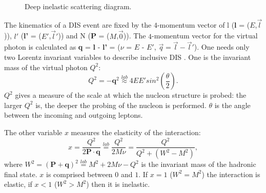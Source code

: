 \begin{figure}[!h]
  \centering

	\caption{Deep inelastic scattering diagram.}
	\label{pic:DIS}
\end{figure}

The kinematics of a DIS event are fixed by the $4$-momentum vector of l (\textbf{l} = ($E$,$\vec{l}$)), $l'$ (\textbf{l'} = ($E'$,$\vec{l}'$)) and N (\textbf{P} = ($M$,$\vec{0}$)). The $4$-momentum vector for the virtual photon is calculated as \textbf{q} = \textbf{l} - \textbf{l'} = ($\nu$ = $E$ - $E'$, $\vec{q}=\vec{l}-\vec{l}'$). One needs only two Lorentz invariant variables to describe inclusive DIS \cite{DISmeas}. One is the invariant mass of the virtual photon $Q^2$:
%
\begin{equation}
  Q^2 = -\textbf{q}^2 \stackrel{lab}{\approx} 4EE'sin^2\left(\frac{\theta}{2}\right).
\end{equation}
%
$Q^2$ gives a measure of the scale at which the nucleon structure is probed: the larger $Q^2$ is, the deeper the probing of the nucleon is performed. $\theta$ is the angle between the incoming and outgoing leptons.

The other variable $x$ measures the elasticity of the interaction:
%
\begin{equation}
  x = \frac{Q^2}{2\textbf{P}\cdot\textbf{q}} \stackrel{lab}{=} \frac{Q^2}{2M\nu} = \frac{Q^2}{Q^2+(W^2-M^2)},
\end{equation}
%
where $W^2 = (\textbf{P}+\textbf{q})^2 \stackrel{lab}{=} M^2 + 2M\nu - Q^2$ is the invariant mass of the hadronic final state. $x$ is comprised between $0$ and $1$. If $x=1$ ($W^2=M^2$) the interaction is elastic, if $x<1$ ($W^2>M^2$) then it is inelastic.

